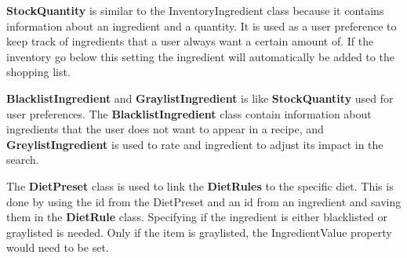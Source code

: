 \textbf{StockQuantity} is similar to the InventoryIngredient class because it contains information about an ingredient and a quantity. It is used as a user preference to keep track of ingredients that a user always want a certain amount of. If the inventory go below this setting the ingredient will automatically be added to the shopping list.

\textbf{BlacklistIngredient} and \textbf{GraylistIngredient} is like \textbf{StockQuantity} used for user preferences. The \textbf{BlacklistIngredient} class contain information about ingredients that the user does not want to appear in a recipe, and \textbf{GreylistIngredient} is used to rate and ingredient to adjust its impact in the search.

The \textbf{DietPreset} class is used to link the \textbf{DietRules} to the specific diet. This is done by using the id from the DietPreset and an id from an ingredient and saving them in the \textbf{DietRule} class. Specifying if the ingredient is either blacklisted or graylisted is needed. Only if the item is graylisted, the IngredientValue property would need to be set. 




